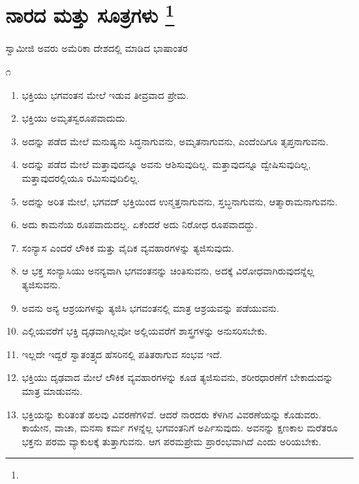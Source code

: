
\chapter[ನಾರದ ಮತ್ತು ಸೂತ್ರಗಳು ]{ನಾರದ ಮತ್ತು ಸೂತ್ರಗಳು \protect\footnote{}}

\centerline{ಸ್ವಾಮೀಜಿ ಅವರು ಅಮೆರಿಕಾ ದೇಶದಲ್ಲಿ ಮಾಡಿದ ಭಾಷಾಂತರ}

\begin{center}
೧
\end{center}

\begin{enumerate}
\item ಭಕ್ತಿಯು ಭಗವಂತನ ಮೇಲೆ ಇಡುವ ತೀವ್ರವಾದ ಪ್ರೇಮ.

 \item ಭಕ್ತಿಯು ಅಮೃತಸ್ವರೂಪವಾದುದು.

 \item ಅದನ್ನು ಪಡೆದ ಮೇಲೆ ಮನುಷ್ಯನು ಸಿದ್ಧನಾಗುವನು, ಅಮೃತನಾಗುವನು, ಎಂದೆಂದಿಗೂ ತೃಪ್ತನಾಗುವನು.

 \item ಅದನ್ನು ಪಡೆದ ಮೇಲೆ ಮತ್ತಾವುದನ್ನೂ ಅವನು ಆಶಿಸುವುದಿಲ್ಲ. ಮತ್ತಾವುದನ್ನೂ ದ್ವೇಷಿಸುವುದಿಲ್ಲ, ಮತ್ತಾವುದರಲ್ಲಿಯೂ ರಮಿಸುವುದಿಲಿಲ್ಲ.

 \item ಅದನ್ನು ಅರಿತ ಮೇಲೆ, ಭಗವದ್​ ಭಕ್ತಿಯಿಂದ ಉನ್ಮತ್ತನಾಗುವನು, ಸ್ತಬ್ಧನಾಗುವನು, ಆತ್ಮಾರಾಮನಾಗುವನು.

 \item ಅದು ಕಾಮನೆಯ ರೂಪವಾದುದಲ್ಲ. ಏಕೆಂದರೆ ಅದು ನಿರೋಧ ರೂಪವಾದದ್ದು.

 \item ಸಂನ್ಯಾಸ ಎಂದರೆ ಲೌಕಿಕ ಮತ್ತು ವೈದಿಕ ವ್ಯವಹಾರಗಳನ್ನು ತ್ಯಜಿಸುವುದು.

 \item ಆ ಭಕ್ತ ಸಂನ್ಯಾಸಿಯು ಅನನ್ಯವಾಗಿ ಭಗವಂತನನ್ನು ಚಿಂತಿಸುವನು, ಅದಕ್ಕೆ ವಿರೋಧವಾಗಿರುವುದನ್ನೆಲ್ಲ ತ್ಯಜಿಸುವನು.

 \item ಅವನು ಅನ್ಯ ಆಶ್ರಯಗಳನ್ನು ತ್ಯಜಿಸಿ ಭಗವಂತನಲ್ಲಿ ಮಾತ್ರ ಆಶ್ರಯವನ್ನು ಪಡೆಯುವನು.

 \item ಎಲ್ಲಿಯವರೆಗೆ ಭಕ್ತಿ ದೃಢವಾಗಿಲ್ಲವೋ ಅಲ್ಲಿಯವರೆಗೆ ಶಾಸ್ತ್ರಗಳನ್ನು ಅನುಸರಿಸಬೇಕು.

 \item ಇಲ್ಲದೇ ಇದ್ದರೆ ಸ್ವಾತಂತ್ರ್ಯದ ಹೆಸರಿನಲ್ಲಿ ಪತಿತರಾಗುವ ಸಂಭವ ಇದೆ.

 \item ಭಕ್ತಿಯು ದೃಢವಾದ ಮೇಲೆ ಲೌಕಿಕ ವ್ಯವಹಾರಗಳನ್ನು ಕೂಡ ತ್ಯಜಿಸುವನು, ಶರೀರಧಾರಣೆಗೆ ಬೇಕಾದುದನ್ನು ಮಾತ್ರ ಮಾಡುವನು.

 \item ಭಕ್ತಿಯನ್ನು ಕುರಿತಂತೆ ಹಲವು ವಿವರಣೆಗಳಿವೆ. ಆದರೆ ನಾರದರು ಕೆಳಗಿನ ವಿವರಣೆಯನ್ನು ಕೊಡುವರು. ಕಾಯೇನ, ವಾಚಾ, ಮನಸಾ ಕರ್ಮ ಗಳನ್ನೆಲ್ಲ ಭಗವಂತನಿಗೆ ಅರ್ಪಿಸುವುದು. ಅವನನ್ನು ಕ್ಷಣಕಾಲ ಮರೆತರೂ ಭಕ್ತನು ಪರಮ ವ್ಯಾಕುಲಕ್ಕೆ ತುತ್ತಾಗುವನು. ಆಗ ಪರಮಪ್ರೇಮ ಪ್ರಾರಂಭವಾಗಿದೆ ಎಂದು ಅರಿಯಬೇಕು.


\end{enumerate}
